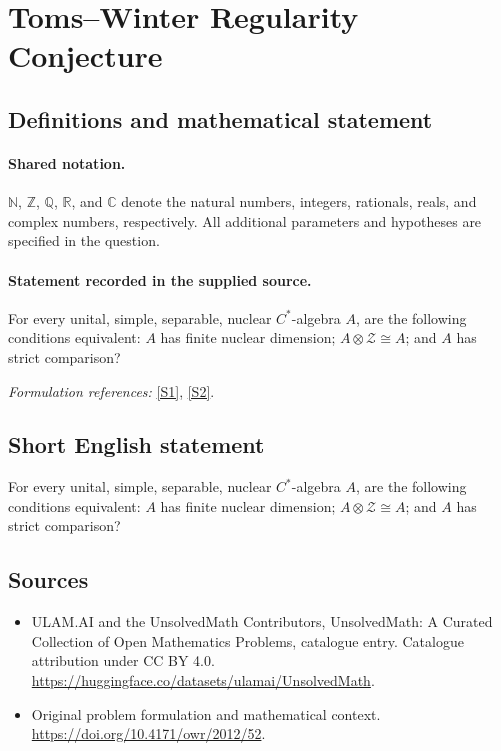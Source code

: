 \documentclass[11pt]{article}
\newcommand{\sref}[2]{\hyperlink{source:#1:#2}{[S#2]}}
\begin{document}
\section{Toms–Winter Regularity Conjecture}\label{statement}

\subsection{Definitions and mathematical statement}

\paragraph{Shared notation.}$\mathbb N$, $\mathbb Z$, $\mathbb Q$, $\mathbb R$, and $\mathbb C$ denote the natural numbers, integers, rationals, reals, and complex numbers, respectively. All additional parameters and hypotheses are specified in the question.


\paragraph{Statement recorded in the supplied source.}
For every unital, simple, separable, nuclear $C^*$-algebra $A$, are the following conditions equivalent: $A$ has finite nuclear dimension; $A\otimes\mathcal Z\cong A$; and $A$ has strict comparison?
\par\smallskip\textit{Formulation references:} \sref{statement}{1}, \sref{statement}{2}.
\subsection{Short English statement}
For every unital, simple, separable, nuclear $C^*$-algebra $A$, are the following conditions equivalent: $A$ has finite nuclear dimension; $A\otimes\mathcal Z\cong A$; and $A$ has strict comparison?
\subsection{Sources}
\begin{itemize}
\item[\hypertarget{source:statement:1}{S1}] ULAM.AI and the UnsolvedMath Contributors, UnsolvedMath: A Curated Collection of Open Mathematics Problems, catalogue entry. Catalogue attribution under CC BY 4.0.
\url{https://huggingface.co/datasets/ulamai/UnsolvedMath}.
\item[\hypertarget{source:statement:2}{S2}] Original problem formulation and mathematical context.
\url{https://doi.org/10.4171/owr/2012/52}.
\end{itemize}
\label{end:statement}
\end{document}
